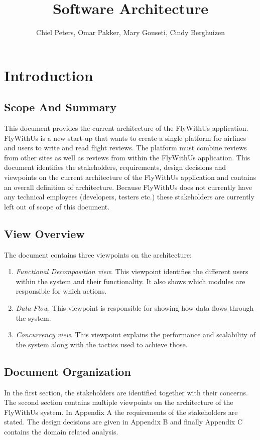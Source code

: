 \documentclass{article}
\begin{document}
\title{Software Architecture}
\author{Chiel Peters, Omar Pakker, Mary Gouseti, Cindy Berghuizen}
\maketitle
\setlength\parindent{0pt}

\section{Introduction}
\subsection{Scope And Summary}
This document provides the current architecture of the FlyWithUs application. FlyWithUs is a new start-up that wants to create a single platform for airlines and users to write and read flight reviews. The platform must combine reviews from other sites as well as reviews from within the FlyWithUs application.
This document identifies the stakeholders, requirements, design decisions and viewpoints on the current architecture of the FlyWithUs application and contains an overall definition of architecture. Because FlyWithUs does not currently have any technical employees (developers, testers etc.) these stakeholders are currently left out of scope of this document.
 
\subsection{View Overview}
The document contains three viewpoints on the architecture:
\begin{enumerate}
\item \emph{Functional Decomposition view}. This viewpoint identifies the different users within the system and their functionality. It also shows which modules are responsible for which actions.
\item \emph{Data Flow}. This viewpoint is responsible for showing how data flows through the system.
\item \emph{Concurrency view}. This viewpoint explains the performance and scalability of the system along with the tactics used to achieve those.
\end{enumerate}
 
\subsection{Document Organization}
In the first section, the stakeholders are identified together with their concerns.
The second section contains multiple viewpoints on the architecture of the FlyWithUs system. In Appendix A the requirements of the stakeholders are stated. The design decisions are given in Appendix B and finally Appendix C contains the domain related analysis.
\end{document}
